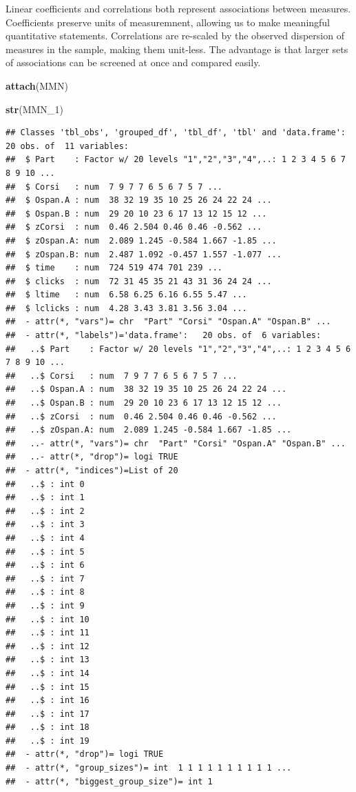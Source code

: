 \documentclass[]{svmono}
\newenvironment{Shaded}{\begin{snugshade}}{\end{snugshade}}
\newcommand{\KeywordTok}[1]{\textcolor[rgb]{0.13,0.29,0.53}{\textbf{#1}}}
\newcommand{\DecValTok}[1]{\textcolor[rgb]{0.00,0.00,0.81}{#1}}
\newcommand{\NormalTok}[1]{#1}
\begin{document}
Linear coefficients and correlations both represent associations between
measures. Coefficients preserve units of measuremnent, allowing us to
make meaningful quantitative statements. Correlations are re-scaled by
the observed dispersion of measures in the sample, making them
unit-less. The advantage is that larger sets of associations can be
screened at once and compared easily.

\begin{Shaded}
\begin{Highlighting}[]
\KeywordTok{attach}\NormalTok{(MMN)}

\KeywordTok{str}\NormalTok{(MMN_}\DecValTok{1}\NormalTok{)}
\end{Highlighting}
\end{Shaded}

\begin{verbatim}
## Classes 'tbl_obs', 'grouped_df', 'tbl_df', 'tbl' and 'data.frame':   20 obs. of  11 variables:
##  $ Part    : Factor w/ 20 levels "1","2","3","4",..: 1 2 3 4 5 6 7 8 9 10 ...
##  $ Corsi   : num  7 9 7 7 6 5 6 7 5 7 ...
##  $ Ospan.A : num  38 32 19 35 10 25 26 24 22 24 ...
##  $ Ospan.B : num  29 20 10 23 6 17 13 12 15 12 ...
##  $ zCorsi  : num  0.46 2.504 0.46 0.46 -0.562 ...
##  $ zOspan.A: num  2.089 1.245 -0.584 1.667 -1.85 ...
##  $ zOspan.B: num  2.487 1.092 -0.457 1.557 -1.077 ...
##  $ time    : num  724 519 474 701 239 ...
##  $ clicks  : num  72 31 45 35 21 43 31 36 24 24 ...
##  $ ltime   : num  6.58 6.25 6.16 6.55 5.47 ...
##  $ lclicks : num  4.28 3.43 3.81 3.56 3.04 ...
##  - attr(*, "vars")= chr  "Part" "Corsi" "Ospan.A" "Ospan.B" ...
##  - attr(*, "labels")='data.frame':   20 obs. of  6 variables:
##   ..$ Part    : Factor w/ 20 levels "1","2","3","4",..: 1 2 3 4 5 6 7 8 9 10 ...
##   ..$ Corsi   : num  7 9 7 7 6 5 6 7 5 7 ...
##   ..$ Ospan.A : num  38 32 19 35 10 25 26 24 22 24 ...
##   ..$ Ospan.B : num  29 20 10 23 6 17 13 12 15 12 ...
##   ..$ zCorsi  : num  0.46 2.504 0.46 0.46 -0.562 ...
##   ..$ zOspan.A: num  2.089 1.245 -0.584 1.667 -1.85 ...
##   ..- attr(*, "vars")= chr  "Part" "Corsi" "Ospan.A" "Ospan.B" ...
##   ..- attr(*, "drop")= logi TRUE
##  - attr(*, "indices")=List of 20
##   ..$ : int 0
##   ..$ : int 1
##   ..$ : int 2
##   ..$ : int 3
##   ..$ : int 4
##   ..$ : int 5
##   ..$ : int 6
##   ..$ : int 7
##   ..$ : int 8
##   ..$ : int 9
##   ..$ : int 10
##   ..$ : int 11
##   ..$ : int 12
##   ..$ : int 13
##   ..$ : int 14
##   ..$ : int 15
##   ..$ : int 16
##   ..$ : int 17
##   ..$ : int 18
##   ..$ : int 19
##  - attr(*, "drop")= logi TRUE
##  - attr(*, "group_sizes")= int  1 1 1 1 1 1 1 1 1 1 ...
##  - attr(*, "biggest_group_size")= int 1
\end{verbatim}
\end{document}
